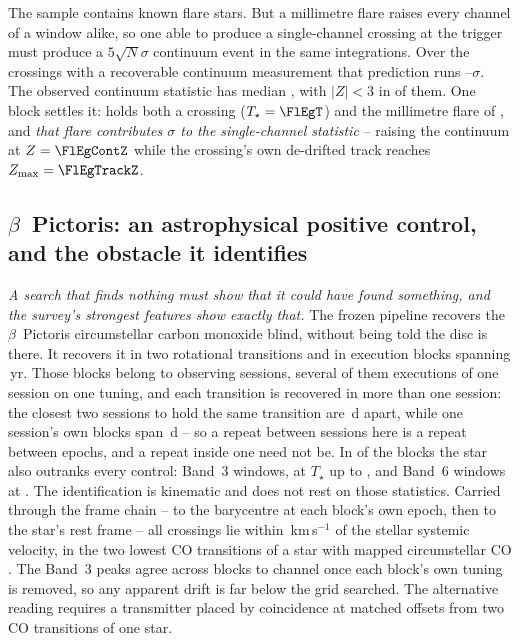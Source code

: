 The sample contains known flare stars. But a millimetre flare raises every
channel of a window alike, so one able to produce a single-channel crossing at
the trigger must produce a $5\sqrt{N}\sigma$ continuum event in the same
integrations. Over the \FlNCont{} crossings with a recoverable continuum measurement
that prediction runs \FlPredLo--\FlPredHi$\sigma$. The observed continuum
statistic has median \FlObsMed, with $|Z|<3$ in \FlNQuiet{} of them. One block settles it: \FlEgStar{} \texttt{\FlEgEb} holds both a
crossing ($T_\star=\FlEgT$) and the millimetre flare of
\citet{MacGregor2020}, and \emph{that flare contributes \FlEgContrib$\sigma$
to the single-channel statistic} -- raising the continuum at $Z=\FlEgContZ$
while the crossing's own de-drifted track reaches $Z_{\max}=\FlEgTrackZ$.

\subsection{$\beta$~Pictoris: an astrophysical positive control, and the
obstacle it identifies} \label{sec:bpicval}

\emph{A search that finds nothing must show that it could have found
something, and the survey's strongest features show exactly that.} The
frozen pipeline recovers the $\beta$~Pictoris circumstellar carbon monoxide
blind, without being told the disc is there. It recovers it in two
rotational transitions and in \CsBpCoBlocks{} execution
blocks spanning \BpBaselineYr\,yr. Those blocks belong to \CsBpCoSess{}
observing sessions, several of them executions of one session on one
tuning, and each transition is recovered in more than one session: the
closest two sessions to hold the same transition are \CsBpCoSepMinD\,d
apart, while one session's own blocks span \QcSameSessMaxD\,d -- so a repeat
between sessions here is a repeat between epochs, and a repeat inside one
need not be.
In \NStageOneBpicEb{} of the blocks the star also outranks every control:
\BpicNFlagThree{} Band~3 windows, at $T_\star$ up to \BpicBThreeTsym, and
\BpicNFlagSix{} Band~6 windows at \BpicBSixTsym. The identification is kinematic and does not rest on those
statistics. Carried through the frame chain -- to the barycentre at each
block's own epoch, then to the star's rest frame -- all \BpicPanelNCo{}
crossings lie within \BpicDvCoHi\,km\,s$^{-1}$ of the stellar systemic
velocity, in the two lowest CO transitions of a star with mapped
circumstellar CO \citep{Dent2014,Matra2017}. The Band~3 peaks agree across blocks to
\BpRecThreeTuneChanMax{} channel once each block's own tuning is removed, so
any apparent drift is far below the grid searched. The alternative reading
requires a transmitter placed by coincidence at matched offsets from two CO
transitions of one star.


